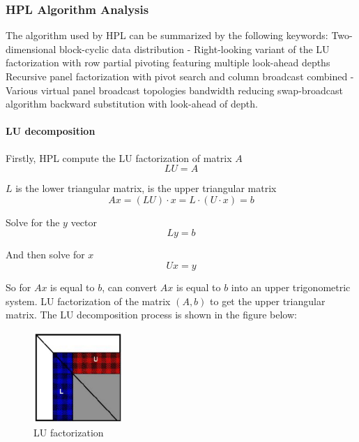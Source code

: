 \documentclass[a4paper,12pt]{article}
\begin{document}
\subsubsection{HPL Algorithm Analysis}

The algorithm used by HPL can be summarized by the following keywords: Two-dimensional block-cyclic data distribution - Right-looking variant of the LU factorization with row partial pivoting featuring multiple look-ahead depths Recursive panel factorization with pivot search and column broadcast combined - Various virtual panel broadcast topologies bandwidth reducing swap-broadcast algorithm backward substitution with look-ahead of depth.

\paragraph{LU decomposition}

Firstly, HPL compute the LU factorization of matrix \( A \)
\begin{equation}
LU=A
\end{equation}

\( L \) is the lower triangular matrix, is the upper triangular matrix
\begin{equation}
Ax=(LU) \cdot x=L \cdot (U \cdot x)=b
\end{equation}

Solve for the \( y \) vector
\begin{equation}
Ly=b
\end{equation}

And then solve for \( x \)
\begin{equation}
U x=y
\end{equation}

So for \( Ax \) is equal to \( b \), can convert \( Ax \) is equal to \( b \) into an upper trigonometric system. LU factorization of the matrix \( (A,b) \) to get the upper triangular matrix. The LU decomposition process is shown in the figure below:

\begin{figure}[H]
    \centering
    \includegraphics[width=0.3\textwidth]{images/algorithm/LU_factorization.png}
    \caption{LU factorization}
    \label{fig:lu_factorization}
\end{figure}
\end{document}
